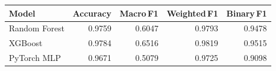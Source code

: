 \begin{tabular}{lrrrr}
  \toprule
  Model & Accuracy & Macro\,F1 & Weighted\,F1 & Binary\,F1 \\ 
  \midrule
  Random Forest & 0.9759 & 0.6047 & 0.9793 & 0.9478 \\
  XGBoost & 0.9784 & 0.6516 & 0.9819 & 0.9515 \\
  PyTorch MLP & 0.9671 & 0.5079 & 0.9725 & 0.9098 \\
  \bottomrule
\end{tabular}